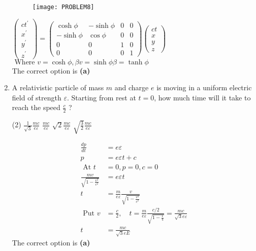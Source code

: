 \begin{enumerate}
\begin{tasks}
\begin{figure}[H]
		\centering
		\texttt{[image: PROBLEM8]}
	\end{figure}
\end{tasks}
\begin{answer}
$	\left(\begin{array}{c}
		c t^{\prime} \\
		x^{\prime} \\
		y^{\prime} \\
		z^{\prime}
	\end{array}\right)=\left(\begin{array}{cccc}
		\cosh \phi & -\sinh \phi & 0 & 0 \\
		-\sinh \phi & \cos \phi & 0 & 0 \\
		0 & 0 & 1 & 0 \\
		0 & 0 & 0 & 1
	\end{array}\right)\left(\begin{array}{l}
		c t \\
		x \\
		y \\
		z
	\end{array}\right)$\\
	$\text { Where } v=\cosh \phi, \beta v=\sinh \phi \beta=\tanh \phi$\\
	The correct option is \textbf{(a)}
\end{answer}

	\item A relativistic particle of mass $m$ and charge $e$ is moving in a uniform electric field of strength $\varepsilon$. Starting from rest at $t=0$, how much time will it take to reach the speed $\frac{c}{2}$ ?
	{}
\begin{tasks}(2)
	\task[\textbf{A.}] $\frac{1}{\sqrt{3}} \frac{m c}{e \varepsilon}$
	\task[\textbf{B.}]$\frac{m c}{e \varepsilon}$
	\task[\textbf{C.}]$\sqrt{2} \frac{m c}{e \varepsilon}$
	\task[\textbf{D.}]$\sqrt{\frac{3}{2}} \frac{m c}{e \varepsilon}$
\end{tasks}
\begin{answer}
\begin{align*}
\frac{d p}{d t}&=e \varepsilon\\
p&=e \varepsilon t+c\\
\text { At } t&=0, p=0, c=0\\
\frac{m v}{\sqrt{1-\frac{v^{2}}{c^{2}}}}&=e \varepsilon t\\
t&=\frac{m}{e \varepsilon} \frac{v}{\sqrt{1-\frac{v^{2}}{c^{2}}}}\\
\text { Put } v&=\frac{c}{2}, \quad t=\frac{m}{e \varepsilon} \frac{c / 2}{\sqrt{1-\frac{1}{4}}}=\frac{m c}{\sqrt{3} e \varepsilon}\\
t&=\frac{m c}{\sqrt{3} e E}
\end{align*}
The correct option is \textbf{(a)}	
\end{answer}
\end{enumerate}
